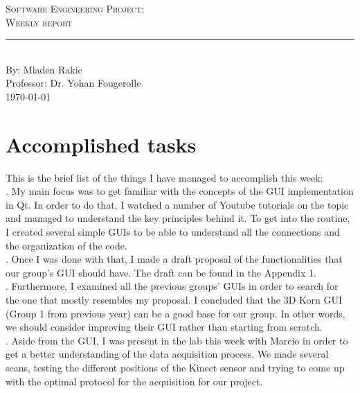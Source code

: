 \documentclass[aps,letterpaper,11pt]{revtex4}
\newcommand{\labno}{Software Engineering Project}
\newcommand{\labtitle}{Weekly report}
\newcommand{\authorname}{Mladen Rakic}
\newcommand{\professor}{Dr. Yohan Fougerolle}
\begin{document}
  
\begin{titlepage}
\begin{center}
{\LARGE \textsc{\labno:} \\ \vspace{4pt}}
{\Large \textsc{\labtitle} \\ \vspace{4pt}} 
\rule[13pt]{\textwidth}{1pt} \\ \vspace{150pt}
{\large By: \authorname \\ \vspace{10pt}
Professor: \professor \\ \vspace{10pt}
\today}
\end{center}


\end{titlepage}%
\newpage
\section {Accomplished tasks}
This is the brief list of the things I have managed to accomplish this week:\\
. My main focus was to get familiar with the concepts of the GUI implementation in Qt. In order to do that, I watched a number of Youtube tutorials on the topic and managed to understand the key principles behind it. To get into the routine, I created several simple GUIs to be able to understand all the connections and the organization of the code.\\ 
. Once I was done with that, I made a draft proposal of the functionalities that our group's GUI should have. The draft can be found in the Appendix 1.\\ 
. Furthermore, I examined all the previous groups' GUIs in order to search for the one that mostly resembles my proposal. I concluded that the 3D Korn GUI (Group 1 from previous year) can be a good base for our group. In other words, we should consider improving their GUI rather than starting from scratch.\\
. Aside from the GUI, I was present in the lab this week with Marcio in order to get a better understanding of the data acquisition process. We made several scans, testing the different positions of the Kinect sensor and trying to come up with the optimal protocol for the acquisition for our project.\\
\end{document}
